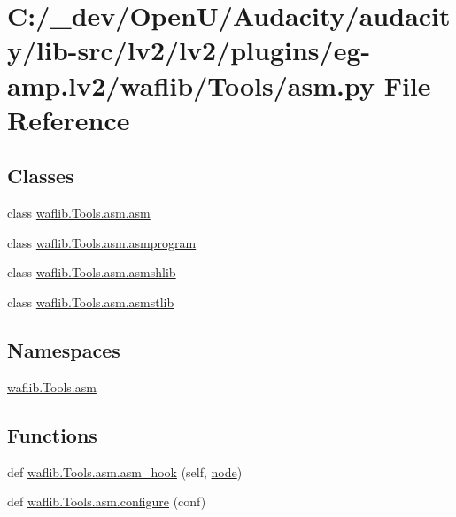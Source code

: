 \hypertarget{lv2_2plugins_2eg-amp_8lv2_2waflib_2_tools_2asm_8py}{}\section{C\+:/\+\_\+dev/\+Open\+U/\+Audacity/audacity/lib-\/src/lv2/lv2/plugins/eg-\/amp.lv2/waflib/\+Tools/asm.py File Reference}
\label{lv2_2plugins_2eg-amp_8lv2_2waflib_2_tools_2asm_8py}
\subsection*{Classes}
\begin{DoxyCompactItemize}
\item 
class \hyperlink{classwaflib_1_1_tools_1_1asm_1_1asm}{waflib.\+Tools.\+asm.\+asm}
\item 
class \hyperlink{classwaflib_1_1_tools_1_1asm_1_1asmprogram}{waflib.\+Tools.\+asm.\+asmprogram}
\item 
class \hyperlink{classwaflib_1_1_tools_1_1asm_1_1asmshlib}{waflib.\+Tools.\+asm.\+asmshlib}
\item 
class \hyperlink{classwaflib_1_1_tools_1_1asm_1_1asmstlib}{waflib.\+Tools.\+asm.\+asmstlib}
\end{DoxyCompactItemize}
\subsection*{Namespaces}
\begin{DoxyCompactItemize}
\item 
 \hyperlink{namespacewaflib_1_1_tools_1_1asm}{waflib.\+Tools.\+asm}
\end{DoxyCompactItemize}
\subsection*{Functions}
\begin{DoxyCompactItemize}
\item 
def \hyperlink{namespacewaflib_1_1_tools_1_1asm_a287387dfaa8ffc9c35127be5128a185a}{waflib.\+Tools.\+asm.\+asm\+\_\+hook} (self, \hyperlink{structnode}{node})
\item 
def \hyperlink{namespacewaflib_1_1_tools_1_1asm_a223dd8eb9aca9f00c6758ed10833701a}{waflib.\+Tools.\+asm.\+configure} (conf)
\end{DoxyCompactItemize}
